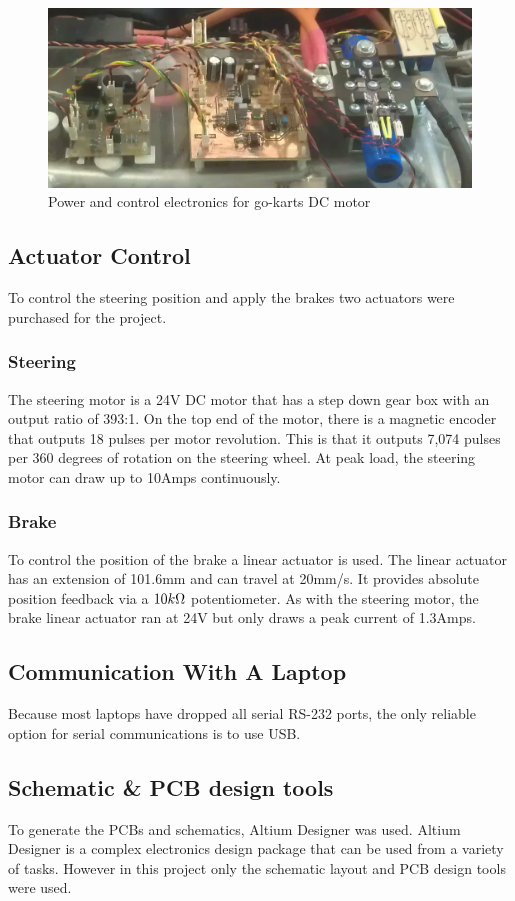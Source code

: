   \begin{figure}[h]
      \centering
      \includegraphics[width=.9\linewidth]{Images/powerE.png}
      \caption{Power and control electronics for go-karts DC motor}
      \label{powerE}
  \end{figure}

\subsection{Actuator Control}
  To control the steering position and apply the brakes two actuators were
  purchased for the project.

  \subsubsection{Steering}
    The steering motor is a 24V DC motor that has a step down gear box with an
    output ratio of 393:1. On the top end of the motor, there is a magnetic
    encoder\cite{encoder} that outputs 18 pulses per motor revolution. This is that it outputs
    7,074 pulses per 360 degrees of rotation on the steering wheel. At peak
    load, the steering motor can draw up to 10Amps continuously.

  \subsubsection{Brake}
    To control the position of the brake a linear actuator is used. The linear
    actuator has an extension of 101.6mm and can travel at 20mm/s. It provides
    absolute position feedback via a $10k\ohm$ potentiometer. As with the
    steering motor, the brake linear actuator ran at 24V but only draws a peak
    current of 1.3Amps.

\subsection{Communication With A Laptop}
  Because most laptops have dropped all serial RS-232 ports, the only reliable
  option for serial communications is to use USB.

\subsection{Schematic \& PCB design tools}
  To generate the PCBs and schematics, Altium Designer was used\cite{altium}.
  Altium Designer is a complex electronics design package that can be used from
  a variety of tasks. However in this project only the schematic layout and PCB
  design tools were used.

